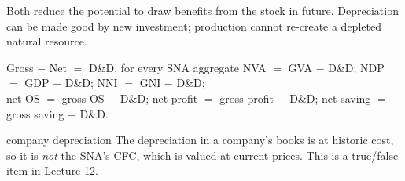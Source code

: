 Both reduce the potential to draw benefits from the stock in future. Depreciation can be made good
by new investment; production cannot re-create a depleted natural resource.

\begin{keybox}{Gross $-$ Net $=$ D\&D, for every SNA aggregate}
\centering
NVA $=$ GVA $-$ D\&D; \quad NDP $=$ GDP $-$ D\&D; \quad NNI $=$ GNI $-$ D\&D;\\
net OS $=$ gross OS $-$ D\&D; \quad net profit $=$ gross profit $-$ D\&D; \quad net saving $=$
gross saving $-$ D\&D.
\end{keybox}

\begin{trap}{company depreciation}
\small The depreciation in a company's books is at historic cost, so it is \emph{not} the SNA's
CFC, which is valued at current prices. This is a true/false item in Lecture 12.
\end{trap}
